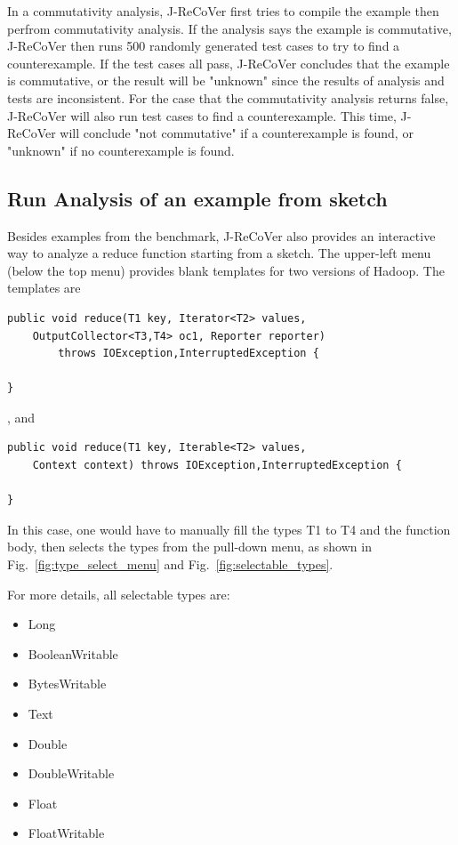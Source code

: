 In a commutativity analysis, J-ReCoVer first tries to compile the example then perfrom commutativity analysis. If the analysis says the example is commutative, J-ReCoVer then runs 500 randomly generated test cases to try to find a counterexample. If the test cases all pass, J-ReCoVer concludes that the example is commutative, or the result will be "unknown" since the results of analysis and tests are inconsistent. For the case that the commutativity analysis returns false, J-ReCoVer will also run test cases to find a counterexample. This time, J-ReCoVer will conclude "not commutative" if a counterexample is found, or "unknown" if no counterexample is found. 

\subsection{Run Analysis of an example from sketch}
\label{appendix:3}

Besides examples from the benchmark, J-ReCoVer also provides an interactive way to analyze a reduce function starting from a sketch.
The upper-left menu (below the top menu) provides blank templates for two versions of Hadoop. The templates are

\begin{mdframed}[roundcorner=5pt]
\begin{verbatim}
public void reduce(T1 key, Iterator<T2> values,
	OutputCollector<T3,T4> oc1, Reporter reporter)
		throws IOException,InterruptedException {

}
\end{verbatim}
\end{mdframed}

, and

\begin{mdframed}[roundcorner=5pt]
\begin{verbatim}
public void reduce(T1 key, Iterable<T2> values,
	Context context) throws IOException,InterruptedException {

}
\end{verbatim}
\end{mdframed}

In this case, one would have to manually fill the types T1 to T4 and the function body, then selects the types from the pull-down menu, as shown in Fig.~\ref{fig:type_select_menu} and Fig.~\ref{fig:selectable_types}.

For more details, all selectable types are:

\begin{itemize}
\item Long
\item BooleanWritable
\item BytesWritable
\item Text
\item Double
\item DoubleWritable
\item Float
\item FloatWritable
\end{itemize}
